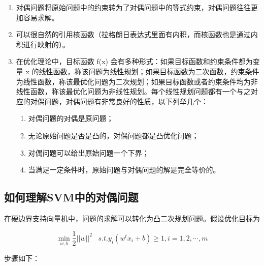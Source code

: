 \begin{enumerate}\itemsep0em
		\item 对偶问题将原始问题中的约束转为了对偶问题中的等式约束，对偶问题往往更加容易求解。
		\item 可以很自然的引用核函数（拉格朗日表达式里面有内积，而核函数也是通过内积进行映射的）。
		\item 在优化理论中，目标函数 f(x) 会有多种形式：如果目标函数和约束条件都为变量 x 的线性函数，称该问题为线性规划；如果目标函数为二次函数，约束条件为线性函数，称该最优化问题为二次规划；如果目标函数或者约束条件均为非线性函数，称该最优化问题为非线性规划。每个线性规划问题都有一个与之对应的对偶问题，对偶问题有非常良好的性质，以下列举几个：

		\begin{enumerate}\itemsep0em
				\item  对偶问题的对偶是原问题；
				\item  无论原始问题是否是凸的，对偶问题都是凸优化问题；
				\item  对偶问题可以给出原始问题一个下界；
				\item  当满足一定条件时，原始问题与对偶问题的解是完全等价的。
		\end{enumerate}
\end{enumerate}

\subsection{如何理解SVM中的对偶问题}

在硬边界支持向量机中，问题的求解可以转化为凸二次规划问题。假设优化目标为

\begin{equation} \label{eq:2.1}
\min_{ w, b}\frac{1}{2}|| w||^2\;\;\;s.t. y_i( w^t x_i+b)\geqslant 1, i=1,2,\cdots,m
\end{equation}

步骤如下：

